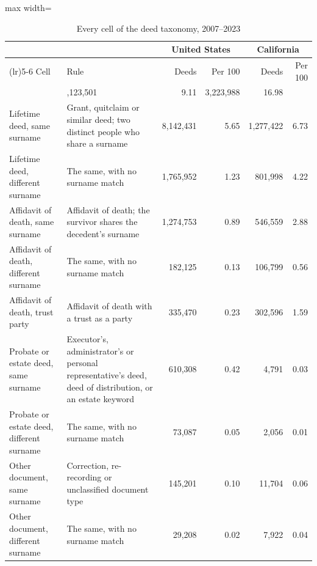 \begin{table}[!ht]\centering
\caption{Every cell of the deed taxonomy, 2007--2023}
\label{tab:taxonomy_detail}
{\scriptsize\setlength{\tabcolsep}{3pt}
\begin{adjustbox}{max width=\textwidth}\begin{tabular}{>{\raggedright\arraybackslash}p{5.6cm}>{\raggedright\arraybackslash}p{6.8cm}rrrr}
\toprule
 & & \multicolumn{2}{c}{United States} & \multicolumn{2}{c}{California} \\
\cmidrule(lr){3-4}\cmidrule(lr){5-6}
Cell & Rule & Deeds & Per 100 & Deeds & Per 100 \\
\midrule
\addlinespace\multicolumn{2}{l}{\emph{A. Family transfers: the measure}} & 13,123,501 & 9.11 & 3,223,988 & 16.98 \\
\hspace{1em}Lifetime deed, same surname & Grant, quitclaim or similar deed; two distinct people who share a surname & 8,142,431 & 5.65 & 1,277,422 & 6.73 \\
\hspace{1em}Lifetime deed, different surname & The same, with no surname match & 1,765,952 & 1.23 & 801,998 & 4.22 \\
\hspace{1em}Affidavit of death, same surname & Affidavit of death; the survivor shares the decedent's surname & 1,274,753 & 0.89 & 546,559 & 2.88 \\
\hspace{1em}Affidavit of death, different surname & The same, with no surname match & 182,125 & 0.13 & 106,799 & 0.56 \\
\hspace{1em}Affidavit of death, trust party & Affidavit of death with a trust as a party & 335,470 & 0.23 & 302,596 & 1.59 \\
\hspace{1em}Probate or estate deed, same surname & Executor's, administrator's or personal representative's deed, deed of distribution, or an estate keyword & 610,308 & 0.42 & 4,791 & 0.03 \\
\hspace{1em}Probate or estate deed, different surname & The same, with no surname match & 73,087 & 0.05 & 2,056 & 0.01 \\
\hspace{1em}Other document, same surname & Correction, re-recording or unclassified document type & 145,201 & 0.10 & 11,704 & 0.06 \\
\hspace{1em}Other document, different surname & The same, with no surname match & 29,208 & 0.02 & 7,922 & 0.04 \\

\end{tabular}
\end{adjustbox}}
\end{table}
